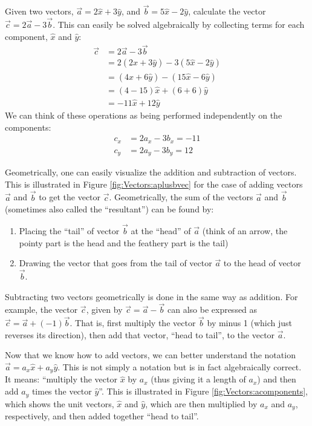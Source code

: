 \begin{example}{Given two vectors, $\vec a=2\hat x+3\hat y$, and $\vec b=5\hat x-2\hat y$, calculate the vector $\vec c= 2\vec a- 3\vec b$.}
This can easily be solved algebraically by collecting terms for each component, $\hat x$ and $\hat y$:
\begin{align*}
\vec c &= 2\vec a- 3\vec b\\
&=2 (2\hat x+3\hat y) - 3 (5\hat x-2\hat y) \\
&=(4\hat x+6\hat y)-(15\hat x-6\hat y) \\
&=(4-15)\hat x + (6+6) \hat y\\
&= -11 \hat x + 12 \hat y
\end{align*}
We can think of these operations as being performed independently on the components:
\begin{align*}
c_x&=2a_x-3b_x=-11\\
c_y&=2a_y-3b_y=12
\end{align*} 
\end{example}

Geometrically, one can easily visualize the addition and subtraction of vectors. This is illustrated in Figure \ref{fig:Vectors:aplusbvec} for the case of adding vectors $\vec a$ and $\vec b$ to get the vector $\vec c$. Geometrically, the sum of the vectors $\vec a$ and $\vec b$ (sometimes also called the ``resultant'') can be found by:
\begin{enumerate}
\item Placing the ``tail'' of vector $\vec b$ at the ``head'' of $\vec a$ (think of an arrow, the pointy part is the head and the feathery part is the tail)
\item Drawing the vector that goes from the tail of vector $\vec a$ to the head of vector $\vec b$.
\end{enumerate}


Subtracting two vectors geometrically is done in the same way as addition. For example, the vector $\vec c$, given by $\vec c=\vec a -\vec b$ can also be expressed as $\vec c = \vec a + (-1) \vec b$. That is, first multiply the vector $\vec b$ by minus 1 (which just reverses its direction), then add that vector, ``head to tail'', to the vector $\vec a$. 

Now that we know how to add vectors, we can better understand the notation $\vec a = a_x \hat x+ a_y\hat y$. This is not simply a notation but is in fact algebraically correct. It means: ``multiply the vector $\hat x$ by $a_x$ (thus giving it a length of $a_x$) and then add $a_y$ times the vector $\hat y$''. This is illustrated in Figure \ref{fig:Vectors:acomponents}, which shows the unit vectors, $\hat x$ and $\hat y$, which are then multiplied by $a_x$ and $a_y$, respectively, and then added together ``head to tail''.

